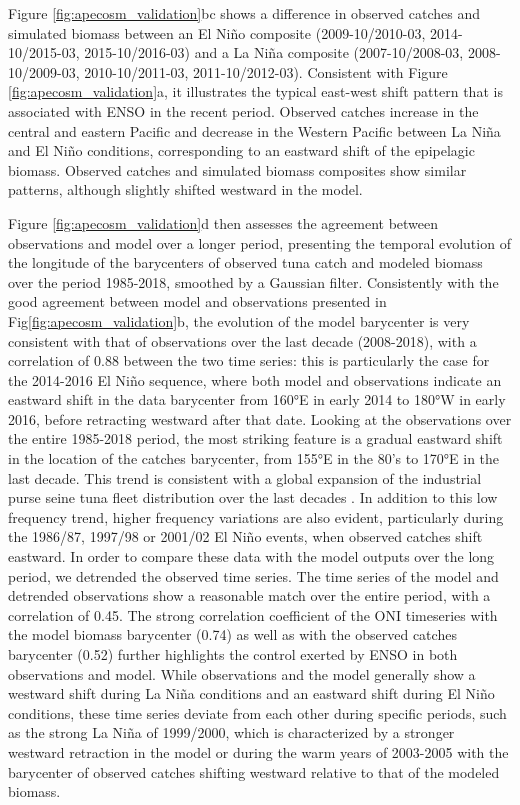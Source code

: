 Figure \ref{fig:apecosm_validation}bc shows a difference in observed catches and simulated biomass between an El Niño composite (2009-10/2010-03, 2014-10/2015-03, 2015-10/2016-03) and a La Niña composite (2007-10/2008-03, 2008-10/2009-03, 2010-10/2011-03, 2011-10/2012-03). Consistent with Figure \ref{fig:apecosm_validation}a, it illustrates the typical east-west shift pattern that is associated with ENSO in the recent period. Observed catches increase in the central and eastern Pacific and decrease in the Western Pacific between La Niña and El Niño conditions, corresponding to an eastward shift of the epipelagic biomass. Observed catches and simulated biomass composites show similar patterns, although slightly shifted westward in the model.

Figure \ref{fig:apecosm_validation}d then assesses the agreement between observations and model over a longer period,  presenting the temporal evolution of the longitude of the barycenters of observed tuna catch and modeled biomass over the period 1985-2018, smoothed by a Gaussian filter. Consistently with the good agreement between model and observations presented in Fig\ref{fig:apecosm_validation}b, the evolution of the model barycenter  is very consistent with that of observations over the last decade (2008-2018), with a correlation of 0.88 between the two time series: this is particularly the case for the 2014-2016 El Niño sequence, where both model and observations indicate an eastward shift in the data barycenter from 160°E in early 2014 to 180°W in early 2016, before retracting westward after that date. Looking at the observations over the entire 1985-2018 period, the most striking feature is a gradual eastward shift in the location of the catches barycenter, from 155°E in the 80's to 170°E in the last decade. This trend is
consistent with a global expansion of the industrial purse seine tuna fleet distribution over the last decades \citep{coulterUsingHarmonizedHistorical2020}. 
In addition to this low frequency trend, higher frequency variations are also evident, particularly during the 1986/87, 1997/98 or 2001/02 El Niño events, when observed catches shift eastward. In order to compare these data with the model outputs over the long period, we detrended the observed time series. The time series of the model and detrended observations show a reasonable match over the entire period, with a correlation of 0.45. The strong correlation coefficient of the ONI timeseries with the model biomass barycenter (0.74) as well as with the observed catches barycenter (0.52) further highlights the control exerted by ENSO in both observations and model. While observations and the model generally show a westward shift during La Niña conditions and an eastward shift during El Niño conditions, these time series deviate from each other during specific periods, such as the strong La Niña of 1999/2000, which is characterized by a stronger westward retraction in the model or during the warm years of 2003-2005 with the barycenter of observed catches shifting westward relative to that of the modeled biomass.

